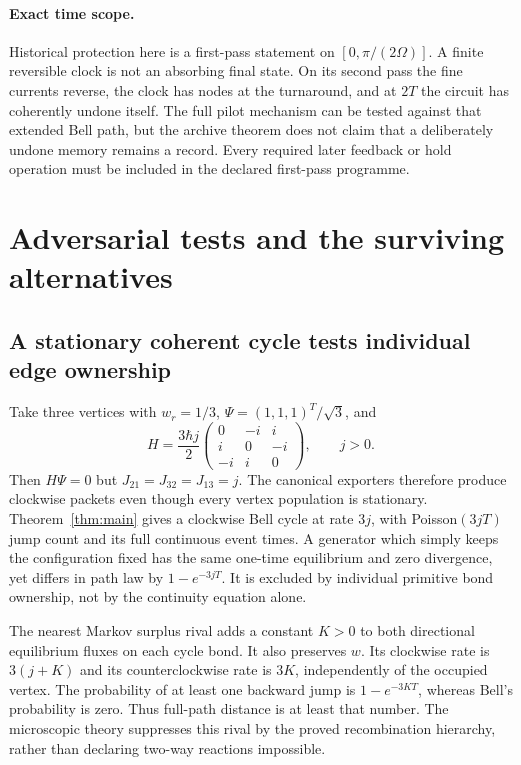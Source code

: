 \documentclass[11pt]{article}
\theoremstyle{definition}\newtheorem{definition}[theorem]{Definition}
\theoremstyle{remark}\newtheorem{remark}[theorem]{Remark}
\begin{document}
\paragraph{Exact time scope.}
Historical protection here is a first-pass statement on
$[0,\pi/(2\Omega)]$.  A finite reversible clock is not an absorbing
final state.  On its second pass the fine currents reverse, the
clock has nodes at the turnaround, and at $2T$ the circuit has
coherently undone itself.  The full pilot mechanism can be tested
against that extended Bell path, but the archive theorem does not
claim that a deliberately undone memory remains a record.  Every
required later feedback or hold operation must be included in the
declared first-pass programme.


\section{Adversarial tests and the surviving alternatives}\label{sec:rivals}
\subsection{A stationary coherent cycle tests individual edge ownership}
Take three vertices with $w_r=1/3$, $\Psi=(1,1,1)^T/\sqrt3$, and
\[
 H=\frac{3\hbar j}{2}
 \begin{pmatrix}0&-i&i\\i&0&-i\\-i&i&0\end{pmatrix},\qquad j>0.
\]
Then $H\Psi=0$ but $J_{21}=J_{32}=J_{13}=j$. The canonical exporters therefore produce clockwise packets even though every vertex population is stationary. Theorem~\ref{thm:main} gives a clockwise Bell cycle at rate $3j$, with Poisson$(3jT)$ jump count and its full continuous event times. A generator which simply keeps the configuration fixed has the same one-time equilibrium and zero divergence, yet differs in path law by $1-e^{-3jT}$. It is excluded by individual primitive bond ownership, not by the continuity equation alone.

The nearest Markov surplus rival adds a constant $K>0$ to both directional equilibrium fluxes on each cycle bond. It also preserves $w$. Its clockwise rate is $3(j+K)$ and its counterclockwise rate is $3K$, independently of the occupied vertex. The probability of at least one backward jump is $1-e^{-3KT}$, whereas Bell's probability is zero. Thus full-path distance is at least that number. The microscopic theory suppresses this rival by the proved recombination hierarchy, rather than declaring two-way reactions impossible.
\end{document}

